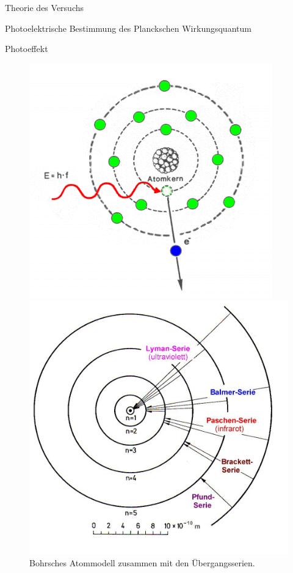 \documentclass[pdftex, a4paper,11pt, twoside, ngerman]{report}
\begin{document}
\begin{chapter}{Theorie des Versuchs}
\begin{section}{Photoelektrische Bestimmung des Planckschen Wirkungsquantum}
\begin{subsection}{Photoeffekt}
	
	\begin{figure}[htbp]
	  \centering
	  \begin{minipage}{0.48\textwidth}
	    \centering
	    \includegraphics[width=.9\textwidth]{Figures/photoeffekt.png}
	    \caption{Schematische Darstellung der Wirkungsweise des Photoeffekts.\cite{bib:Photoeffekt}}\label{fig:Photoeffekt}
	  \end{minipage}\quad
	  \begin{minipage}{0.48\textwidth}
	    \centering
	    \includegraphics[width=.9\textwidth]{Figures/BohrschesAtommodellSerien.png}
	    \caption{Bohrsches Atommodell zusammen mit den Übergangsserien.\cite{bib:BohrschesAtommodellSerien}}\label{fig:BohrschesAtommodellSerien}
	  \end{minipage}
	\end{figure}
	

\end{subsection}
\end{section}
\end{chapter}
\end{document}

